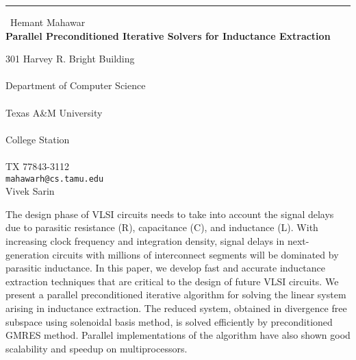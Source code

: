 \documentclass{report}
\begin{document}
\begin{center}
\rule{6in}{1pt} \
{\large Hemant Mahawar \\
{\bf Parallel Preconditioned Iterative Solvers for Inductance Extraction}}

301 Harvey R. Bright Building \\ \\ Department of Computer Science \\ \\ Texas A&M University \\ \\ College Station \\ \\ TX 77843-3112
\\
{\tt mahawarh@cs.tamu.edu}\\
Vivek Sarin\end{center}

The design phase of VLSI circuits needs to take into account the signal
delays due to parasitic resistance (R), capacitance (C), and inductance
(L). With increasing clock frequency and integration density, signal
delays in next-generation circuits with millions of interconnect segments
will be dominated by parasitic inductance. In this paper, we develop fast
and accurate inductance extraction techniques that are critical to the
design of future VLSI circuits. We present a parallel preconditioned
iterative algorithm for solving the linear system arising in inductance
extraction. The reduced system, obtained in divergence free subspace
using solenoidal basis method, is solved efficiently by preconditioned
GMRES method. Parallel implementations of the algorithm have also shown
good scalability and speedup on multiprocessors.
\end{document}
